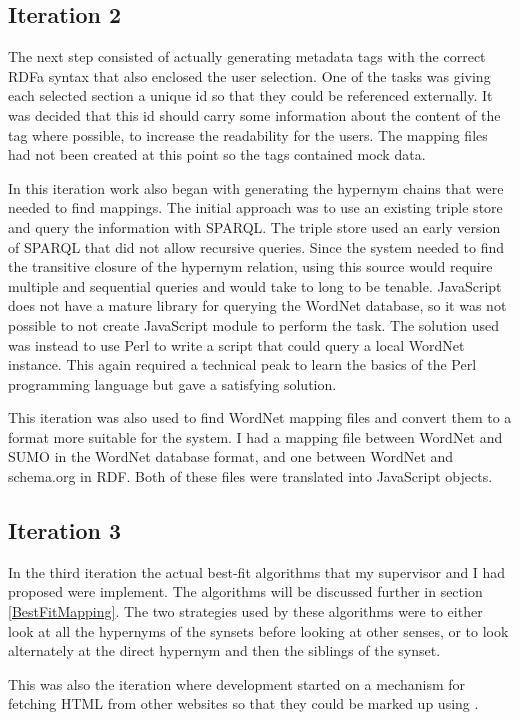 \subsection{Iteration 2}
The next step consisted of actually generating metadata tags with the correct RDFa syntax that also enclosed the user selection.
One of the tasks was giving each selected section a unique id so that they could be referenced externally.
It was decided that this id should carry some information about the content of the tag where possible,
to increase the readability for the users.
The mapping files had not been created at this point so the tags contained mock data.

In this iteration work also began with generating the hypernym chains that were needed to find mappings.
The initial approach was to use an existing triple store and query the information with SPARQL.
The triple store used an early version of SPARQL that did not allow recursive queries.
Since the system needed to find the transitive closure of the hypernym relation,
using this source would require multiple and sequential queries and would take to long to be tenable.
JavaScript does not have a mature library for querying the WordNet database,
so it was not possible to not create JavaScript module to perform the task.
The solution used was instead to use Perl to write a script that could query a local WordNet instance.
This again required a technical peak to learn the basics of the Perl programming language but gave a satisfying solution.

This iteration was also used to find WordNet mapping files and convert them to a format more suitable for the system.
I had a mapping file between WordNet and SUMO in the WordNet database format,
and one between WordNet and schema.org in RDF.
Both of these files were translated into JavaScript objects.

\subsection{Iteration 3}
In the third iteration the actual best-fit algorithms that my supervisor and I had proposed were implement.
The algorithms will be discussed further in section \ref{BestFitMapping}.
The two strategies used by these algorithms were to either look at all the hypernyms of the synsets before looking at other senses,
or to look alternately at the direct hypernym and then the siblings of the synset.

This was also the iteration where development started on  a mechanism for fetching HTML from other websites so that they could be
marked up using \theartefact.

